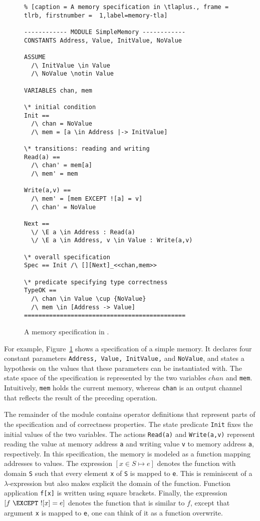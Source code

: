 \begin{figure}
\begin{lstlisting}% [caption = A memory specification in \tlaplus., frame = tlrb, firstnumber =  1,label=memory-tla]

------------ MODULE SimpleMemory ------------
CONSTANTS Address, Value, InitValue, NoValue

ASSUME 
  /\ InitValue \in Value
  /\ NoValue \notin Value

VARIABLES chan, mem

\* initial condition
Init == 
  /\ chan = NoValue
  /\ mem = [a \in Address |-> InitValue]

\* transitions: reading and writing
Read(a) == 
  /\ chan' = mem[a]
  /\ mem' = mem

Write(a,v) ==
  /\ mem' = [mem EXCEPT ![a] = v]
  /\ chan' = NoValue

Next ==
  \/ \E a \in Address : Read(a)
  \/ \E a \in Address, v \in Value : Write(a,v)

\* overall specification
Spec == Init /\ [][Next]_<<chan,mem>>

\* predicate specifying type correctness
TypeOK == 
  /\ chan \in Value \cup {NoValue}
  /\ mem \in [Address -> Value] 
=============================================
\end{lstlisting}
\caption{A memory specification in \tlaplus.}
\label{memory-tla}
\end{figure}

For example, Figure~\ref{memory-tla} shows a \tlaplus specification of a simple memory. It declares four constant parameters \verb|Address, Value, InitValue,| and \verb|NoValue|, and states a hypothesis on the values that these parameters can be instantiated with. The state space of the specification is represented by the two variables $chan$ and \verb|mem|. Intuitively, \verb|mem| holds the current memory, whereas \verb|chan| is an output channel that reflects the result of the preceding operation.

The remainder of the \tlaplus module contains operator definitions that represent parts of the specification and of correctness properties. The state predicate \verb|Init| fixes the initial values of the two variables. The actions \verb|Read(a)| and \verb|Write(a,v)| represent reading the value at memory address \verb|a| and writing value \verb|v| to memory address \verb|a|, respectively. In this specification, the memory is modeled as a function mapping addresses to values. The \tlaplus expression $[x \in S \mapsto e]$ denotes the function with domain \verb|S| such that every element \verb|x| of \verb|S| is mapped to \verb|e|. This is reminiscent of a $\lambda$-expression but also makes explicit the domain of the function. Function application \verb|f[x]| is written using square brackets. Finally, the expression $[f\ \EXCEPT\ ![x] = e]$ denotes the function that is similar to $f$, except that argument \verb|x| is mapped to \verb|e|, one can think of it as a function overwrite.

